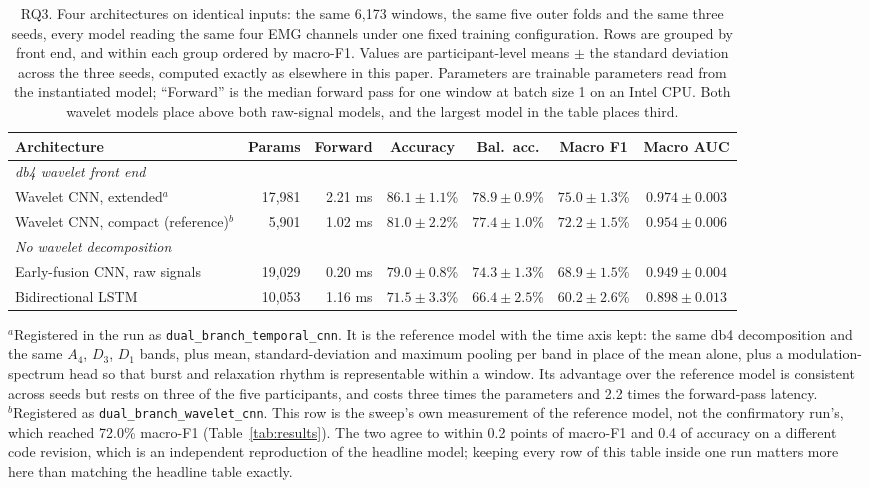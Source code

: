 \documentclass[pdflatex,sn-nature,iicol]{sn-jnl}
\begin{document}
\begin{table}[t]
  \centering
  \caption{RQ3. Four architectures on identical inputs: the same 6,173 windows, the same five outer folds and the same three seeds, every model reading the same four EMG channels under one fixed training configuration. Rows are grouped by front end, and within each group ordered by macro-F1. Values are participant-level means $\pm$ the standard deviation across the three seeds, computed exactly as elsewhere in this paper. Parameters are trainable parameters read from the instantiated model; ``Forward'' is the median forward pass for one window at batch size 1 on an Intel CPU. Both wavelet models place above both raw-signal models, and the largest model in the table places third.}
  \label{tab:architectures}
  \footnotesize
  \begin{tabular*}{\textwidth}{@{\extracolsep{\fill}}lrrcccc@{}}
    \toprule
    Architecture & Params & Forward & Accuracy & Bal.\ acc. & Macro F1 & Macro AUC \\
    \midrule
    \multicolumn{7}{l}{\emph{db4 wavelet front end}}\\
    Wavelet CNN, extended$^{a}$ & 17,981 & 2.21 ms & $\mathbf{86.1 \pm 1.1}$\% & $\mathbf{78.9 \pm 0.9}$\% & $\mathbf{75.0 \pm 1.3}$\% & $\mathbf{0.974 \pm 0.003}$ \\
    Wavelet CNN, compact (reference)$^{b}$ & 5,901 & 1.02 ms & $81.0 \pm 2.2$\% & $77.4 \pm 1.0$\% & $72.2 \pm 1.5$\% & $0.954 \pm 0.006$ \\
    \midrule
    \multicolumn{7}{l}{\emph{No wavelet decomposition}}\\
    Early-fusion CNN, raw signals & 19,029 & 0.20 ms & $79.0 \pm 0.8$\% & $74.3 \pm 1.3$\% & $68.9 \pm 1.5$\% & $0.949 \pm 0.004$ \\
    Bidirectional LSTM & 10,053 & 1.16 ms & $71.5 \pm 3.3$\% & $66.4 \pm 2.5$\% & $60.2 \pm 2.6$\% & $0.898 \pm 0.013$ \\
    \bottomrule
  \end{tabular*}
  \begin{flushleft}\footnotesize
  $^{a}$Registered in the run as \texttt{dual\_branch\_temporal\_cnn}. It is the reference model with the time axis kept: the same db4 decomposition and the same $A_4$, $D_3$, $D_1$ bands, plus mean, standard-deviation and maximum pooling per band in place of the mean alone, plus a modulation-spectrum head so that burst and relaxation rhythm is representable within a window. Its advantage over the reference model is consistent across seeds but rests on three of the five participants, and costs three times the parameters and 2.2 times the forward-pass latency.\\
  $^{b}$Registered as \texttt{dual\_branch\_wavelet\_cnn}. This row is the sweep's own measurement of the reference model, not the confirmatory run's, which reached 72.0\% macro-F1 (Table~\ref{tab:results}). The two agree to within 0.2 points of macro-F1 and 0.4 of accuracy on a different code revision, which is an independent reproduction of the headline model; keeping every row of this table inside one run matters more here than matching the headline table exactly.
  \end{flushleft}
\end{table}
\end{document}
